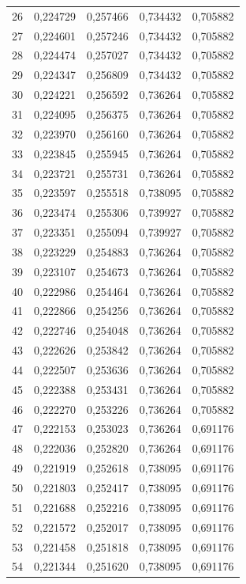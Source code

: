 \begin{tabular}{lrrrr}
26 & 0,224729 & 0,257466 & 0,734432 & 0,705882 \\
27 & 0,224601 & 0,257246 & 0,734432 & 0,705882 \\
28 & 0,224474 & 0,257027 & 0,734432 & 0,705882 \\
29 & 0,224347 & 0,256809 & 0,734432 & 0,705882 \\
30 & 0,224221 & 0,256592 & 0,736264 & 0,705882 \\
31 & 0,224095 & 0,256375 & 0,736264 & 0,705882 \\
32 & 0,223970 & 0,256160 & 0,736264 & 0,705882 \\
33 & 0,223845 & 0,255945 & 0,736264 & 0,705882 \\
34 & 0,223721 & 0,255731 & 0,736264 & 0,705882 \\
35 & 0,223597 & 0,255518 & 0,738095 & 0,705882 \\
36 & 0,223474 & 0,255306 & 0,739927 & 0,705882 \\
37 & 0,223351 & 0,255094 & 0,739927 & 0,705882 \\
38 & 0,223229 & 0,254883 & 0,736264 & 0,705882 \\
39 & 0,223107 & 0,254673 & 0,736264 & 0,705882 \\
40 & 0,222986 & 0,254464 & 0,736264 & 0,705882 \\
41 & 0,222866 & 0,254256 & 0,736264 & 0,705882 \\
42 & 0,222746 & 0,254048 & 0,736264 & 0,705882 \\
43 & 0,222626 & 0,253842 & 0,736264 & 0,705882 \\
44 & 0,222507 & 0,253636 & 0,736264 & 0,705882 \\
45 & 0,222388 & 0,253431 & 0,736264 & 0,705882 \\
46 & 0,222270 & 0,253226 & 0,736264 & 0,705882 \\
47 & 0,222153 & 0,253023 & 0,736264 & 0,691176 \\
48 & 0,222036 & 0,252820 & 0,736264 & 0,691176 \\
49 & 0,221919 & 0,252618 & 0,738095 & 0,691176 \\
50 & 0,221803 & 0,252417 & 0,738095 & 0,691176 \\
51 & 0,221688 & 0,252216 & 0,738095 & 0,691176 \\
52 & 0,221572 & 0,252017 & 0,738095 & 0,691176 \\
53 & 0,221458 & 0,251818 & 0,738095 & 0,691176 \\
54 & 0,221344 & 0,251620 & 0,738095 & 0,691176 \\

\end{tabular}
